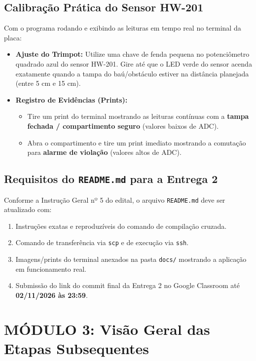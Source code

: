 \documentclass[11pt,a4paper]{article}
\begin{document}
\subsection{Calibração Prática do Sensor HW-201}
Com o programa rodando e exibindo as leituras em tempo real no terminal da placa:
\begin{itemize}[leftmargin=*]
    \item \textbf{Ajuste do Trimpot:} Utilize uma chave de fenda pequena no potenciômetro quadrado azul do sensor HW-201. Gire até que o LED verde do sensor acenda exatamente quando a tampa do baú/obstáculo estiver na distância planejada (entre 5 cm e 15 cm).
    \item \textbf{Registro de Evidências (Prints):}
    \begin{itemize}
        \item Tire um print do terminal mostrando as leituras contínuas com a \textbf{tampa fechada / compartimento seguro} (valores baixos de ADC).
        \item Abra o compartimento e tire um print imediato mostrando a comutação para \textbf{alarme de violação} (valores altos de ADC).
    \end{itemize}
\end{itemize}

\subsection{Requisitos do \texttt{README.md} para a Entrega 2}
Conforme a Instrução Geral nº 5 do edital, o arquivo \texttt{README.md} deve ser atualizado com:
\begin{enumerate}[leftmargin=*]
    \item Instruções exatas e reproduzíveis do comando de compilação cruzada.
    \item Comando de transferência via \texttt{scp} e de execução via \texttt{ssh}.
    \item Imagens/prints do terminal anexados na pasta \texttt{docs/} mostrando a aplicação em funcionamento real.
    \item Submissão do link do commit final da Entrega 2 no Google Classroom até \textbf{02/11/2026 às 23:59}.
\end{enumerate}

\newpage
\section{MÓDULO 3: Visão Geral das Etapas Subsequentes}
\end{document}
